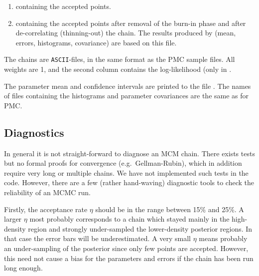 \documentclass[11pt, chapterprefix, headsepline]{scrartcl}
\begin{document}
\begin{appendix}
\begin{enumerate}
  \item {} containing the accepted points.

  \item {} containing the accepted points after
    removal of the burn-in phase and after de-correlating
    (thinning-out) the chain. The results produced by 
    (mean, errors, histograms, covariance) are based on this file.
\end{enumerate}

The chains are \texttt{ASCII}-files, in the same format as the PMC
sample files. All weights are 1, and the second column contains the
log-likelihood (only in .


The parameter mean and confidence intervals are printed to the file
. The names of files containing the histograms and parameter
covariances are the same as for PMC.








\subsection{Diagnostics}

In general it is not straight-forward to diagnose an MCM chain. There
exists tests but no formal proofs for convergence
(e.g.~Gellman-Rubin), which in addition require very long or multiple
chains. We have not implemented such tests in the code. However,
there are a few (rather hand-waving) diagnostic tools to check the
reliability of an MCMC run.

Firstly, the acceptance rate $\eta$ should be in the range between
15\% and 25\%. A larger $\eta$ most probably corresponds to a chain
which stayed mainly in the high-density region and strongly
under-sampled the lower-density posterior regions. In that case the
error bars will be underestimated. A very small $\eta$ means probably
an under-sampling of the posterior since only few points are
accepted. However, this need not cause a bias for the parameters and
errors if the chain has been run long enough.



\end{appendix}
\end{document}
